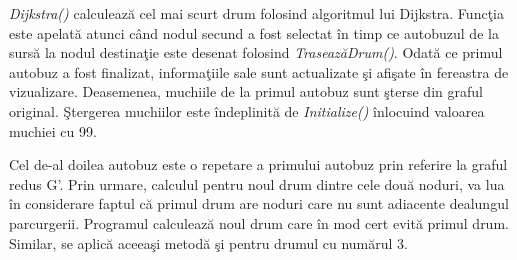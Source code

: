 \documentclass[11pt,a4paper]{report}
\begin{document}
		\textit{Dijkstra()} calculeaz\u a cel mai scurt drum folosind algoritmul lui Dijkstra. Func\c tia este apelat\u a atunci c\^ and 
		nodul secund a fost selectat \^ in timp ce autobuzul de la surs\u a la nodul destina\c tie este desenat folosind \textit{Traseaz\u aDrum()}. 
		Odat\u a ce primul autobuz a fost finalizat, informa\c tiile sale sunt actualizate \c si afi\c sate \^ in fereastra de vizualizare. 
		Deasemenea, muchiile de la primul autobuz sunt \c sterse din graful original. \c Stergerea muchiilor este \^ indeplinit\u a de 
		\textit{Initialize()} \^ inlocuind valoarea muchiei cu 99.
		
		Cel de-al doilea autobuz este o repetare a primului autobuz prin referire la graful redus G'. Prin urmare, calculul pentru noul drum 
		dintre cele dou\u a noduri, va lua \^ in considerare faptul c\u a primul drum are noduri care nu sunt adiacente dealungul parcurgerii. 
		Programul calculeaz\u a noul drum care \^ in mod cert evit\u a primul drum. Similar, se aplic\u a aceea\c si metod\u a \c si pentru 
		drumul cu num\u arul 3.
   
\end{document}
